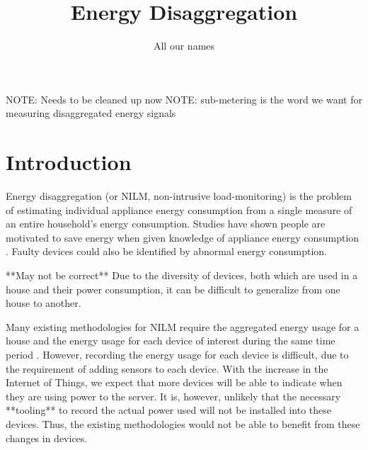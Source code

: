 \documentclass{article}
\title{Energy Disaggregation}
\author{All our names}
\date{}
\begin{document}
\maketitle


NOTE: Needs to be cleaned up now
NOTE: sub-metering is the word we want for measuring disaggregated energy signals

\section{Introduction}

Energy disaggregation (or NILM, non-intrusive load-monitoring) is the problem of estimating individual appliance energy consumption from a single measure of an entire household's energy consumption.
Studies have shown people are motivated to save energy when given knowledge of appliance energy consumption \cite{Darby}.
Faulty devices could also be identified by abnormal energy consumption.


**May not be correct** Due to the diversity of devices, both which are used in a house and their power consumption, it can be difficult to generalize from one house to another.

Many existing methodologies for NILM require the aggregated energy usage for a house and the energy usage for each device of interest during the same time period \cite{Kelly, Cicchetti}. 
However, recording the energy usage for each device is difficult, due to the requirement of adding sensors to each device.
With the increase in the Internet of Things, we expect that more devices will be able to indicate when they are using power to the server.
It is, however, unlikely that the necessary **tooling** to record the actual power used will not be installed into these devices.
Thus, the existing methodologies would not be able to benefit from these changes in devices.
\end{document}
